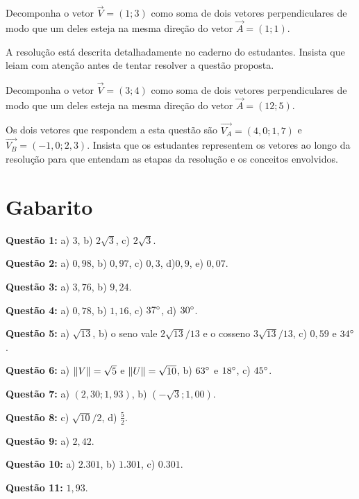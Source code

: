 \documentclass[main_estudante.tex]{subfiles}
\begin{document}
\begin{resolvida}
Decomponha o vetor $\overrightarrow{V}=(1;3)$ como soma de dois vetores perpendiculares de modo que um deles esteja na mesma direção do vetor $\overrightarrow{A}=(1;1)$.
\end{resolvida}

A resolução está descrita detalhadamente no caderno do estudantes. Insista que leiam com atenção antes de tentar resolver a questão proposta.

\begin{resolva}
Decomponha o vetor $\overrightarrow{V}=(3;4)$ como soma de dois vetores perpendiculares de modo que um deles esteja na mesma direção do vetor $\overrightarrow{A}=(12;5)$.
\end{resolva}

Os dois vetores que respondem a esta questão são $\overrightarrow{V_A}=(4,0;1,7)$ e $\overrightarrow{V_B}=(-1,0;2,3)$. Insista que os estudantes representem os vetores ao longo da resolução para que entendam as etapas da resolução e os conceitos envolvidos.

\section{Gabarito}

\noindent\textbf{Questão 1:} a) $3$, b) $2\sqrt{3}$, c) $2\sqrt{3}$.

\noindent\textbf{Questão 2:} a) $0,98$, b) $0,97$, c) $0,3$, d)$0,9$, e) $0,07$.

\noindent\textbf{Questão 3:} a) $3,76$, b) $9,24$.

\noindent\textbf{Questão 4:} a) $0,78$, b) $1,16$, c) $37\degree$, d) $30\degree$.

\noindent\textbf{Questão 5:} a) $\sqrt{13}$, b) o seno vale $2\sqrt{13}/13$ e o cosseno $3\sqrt{13}/13$, c) $0,59$ e $34\degree$.

\noindent\textbf{Questão 6:} a) $\Arrowvert V \Arrowvert = \sqrt{5}$ e $\Arrowvert U \Arrowvert = \sqrt{10}$, b) $63\degree$ e $18\degree$, c) $45\degree$.

\noindent\textbf{Questão 7:} a) $(2,30;1,93)$, b) $(-\sqrt{3};1,00)$.

\noindent\textbf{Questão 8:} c) $\sqrt{10}/2$, d) $\frac{5}{2}$.

\noindent\textbf{Questão 9:} a) $2,42$.

\noindent\textbf{Questão 10:} a) $2.301$, b) $1.301$, c) $0.301$.

\noindent\textbf{Questão 11:} $1,93$.
\end{document}
